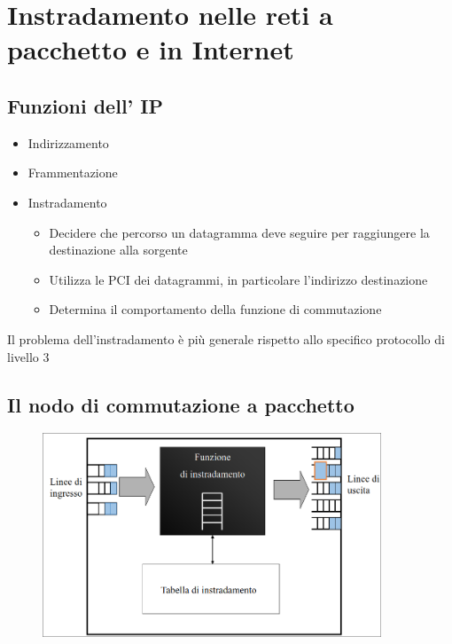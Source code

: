 \documentclass{report}
\begin{document}
    \chapter{Instradamento nelle reti a pacchetto e in Internet}
        \section{Funzioni dell' IP}
            \begin{itemize}
                \item Indirizzamento
                \item Frammentazione
                \item Instradamento
                    \begin{itemize}
                        \item Decidere che percorso un datagramma deve seguire per raggiungere la destinazione alla sorgente
                        \item Utilizza le PCI dei datagrammi, in particolare l'indirizzo destinazione
                        \item Determina il comportamento della funzione di commutazione
                    \end{itemize}
            \end{itemize}
            Il problema dell'instradamento è più generale rispetto allo specifico protocollo di livello 3
        \section{Il nodo di commutazione a pacchetto}
            \begin{figure}[H]
                \includegraphics[width=0.9\textwidth]{3/nCp.png}
            \end{figure}
\end{document}
